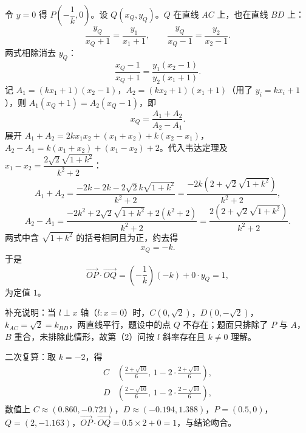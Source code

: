 \begin{answer}
令 $y=0$ 得 $P\left(-\dfrac1k,0\right)$。设 $Q(x_Q,y_Q)$。$Q$ 在直线 $AC$ 上，也在直线 $BD$ 上：
\nopagebreak[4]
\[\frac{y_Q}{x_Q+1}=\frac{y_1}{x_1+1},\qquad \frac{y_Q}{x_Q-1}=\frac{y_2}{x_2-1}.\]
两式相除消去 $y_Q$：
\nopagebreak[4]
\[\frac{x_Q-1}{x_Q+1}=\frac{y_1(x_2-1)}{y_2(x_1+1)}.\]
记 $A_1=(kx_1+1)(x_2-1)$，$A_2=(kx_2+1)(x_1+1)$（用了 $y_i=kx_i+1$），则 $A_1(x_Q+1)=A_2(x_Q-1)$，即
\nopagebreak[4]
\[x_Q=\frac{A_1+A_2}{A_2-A_1}.\]
展开 $A_1+A_2=2kx_1x_2+(x_1+x_2)+k(x_2-x_1)$，$A_2-A_1=k(x_1+x_2)+(x_1-x_2)+2$。代入韦达定理及 $x_1-x_2=\dfrac{2\sqrt2\sqrt{1+k^2}}{k^2+2}$：
\nopagebreak[4]
\[A_1+A_2=\frac{-2k-2k-2\sqrt2k\sqrt{1+k^2}}{k^2+2}=\frac{-2k\left(2+\sqrt2\sqrt{1+k^2}\right)}{k^2+2},\]
\nopagebreak[4]
\[A_2-A_1=\frac{-2k^2+2\sqrt2\sqrt{1+k^2}+2(k^2+2)}{k^2+2}=\frac{2\left(2+\sqrt2\sqrt{1+k^2}\right)}{k^2+2}.\]
两式中含 $\sqrt{1+k^2}$ 的括号相同且为正，约去得
\nopagebreak[4]
\[x_Q=-k.\]
于是
\nopagebreak[4]
\[\overrightarrow{OP}\cdot\overrightarrow{OQ}=\left(-\frac1k\right)(-k)+0\cdot y_Q=1,\]
为定值 $1$。

补充说明：当 $l\perp x$ 轴（$l\colon x=0$）时，$C(0,\sqrt2)$，$D(0,-\sqrt2)$，$k_{AC}=\sqrt2=k_{BD}$，两直线平行，题设中的点 $Q$ 不存在；题面只排除了 $P$ 与 $A$，$B$ 重合，未排除此情形，故第（2）问按 $l$ 斜率存在且 $k\neq0$ 理解。

二次复算：取 $k=-2$，得
\nopagebreak[4]
\[
\begin{aligned}
C&\left(\frac{2+\sqrt{10}}{6},\,1-2\cdot\frac{2+\sqrt{10}}{6}\right),\\
D&\left(\frac{2-\sqrt{10}}{6},\,1-2\cdot\frac{2-\sqrt{10}}{6}\right),
\end{aligned}
\]
数值上 $C\approx(0.860,-0.721)$，$D\approx(-0.194,1.388)$，$P=(0.5,0)$，$Q=(2,-1.163)$，$\overrightarrow{OP}\cdot\overrightarrow{OQ}=0.5\times2+0=1$，与结论吻合。



\end{answer}
